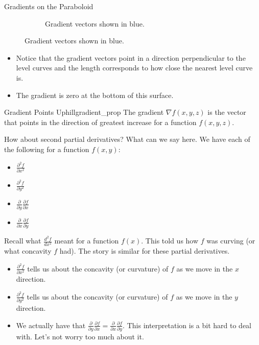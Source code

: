 \begin{ex}{Gradients on the Paraboloid}
\begin{figure}[H]
\begin{subfigure}[h]{.45\textwidth}
            \caption{Gradient vectors shown in blue.}
            \end{subfigure}
        \end{figure}
        \begin{itemize}
            \item Notice that the gradient vectors point in a direction perpendicular to the level curves and the length corresponds to how close the nearest level curve is.
            \item The gradient is zero at the bottom of this surface.  
        \end{itemize}
        \end{ex}
        
        \begin{prop}{Gradient Points Uphill}{gradient_prop}
        The gradient $\nabla f(x,y,z)$ is the vector that points in the direction of greatest increase for a function $f(x,y,z)$.
        \end{prop}
        
        How about second partial derivatives? What can we say here. We have each of the following for a function $f(x,y)$:
        \begin{itemize}
            \item $\frac{\partial^2 f}{\partial x^2}$
            \item $\frac{\partial^2 f}{\partial y^2}$
            \item $\frac{\partial}{\partial y}\frac{\partial f}{\partial x}$
            \item $\frac{\partial}{\partial x}\frac{\partial f}{\partial y}$
        \end{itemize}
        
        Recall what $\frac{d^2 f}{dx^2}$ meant for a function $f(x)$.  This told us how $f$ was curving (or what concavity $f$ had). The story is similar for these partial derivatives.
        
        \begin{itemize}
            \item $\frac{\partial^2 f}{\partial x^2}$ tells us about the concavity (or curvature) of $f$ as we move in the $x$ direction.
            \item $\frac{\partial^2 f}{\partial y^2}$ tells us about the concavity (or curvature) of $f$ as we move in the $y$ direction.
            \item We actually have that $\frac{\partial}{\partial y}\frac{\partial f}{\partial x}=\frac{\partial}{\partial x}\frac{\partial f}{\partial y}$.  This interpretation is a bit hard to deal with.  Let's not worry too much about it.
        \end{itemize}
        
